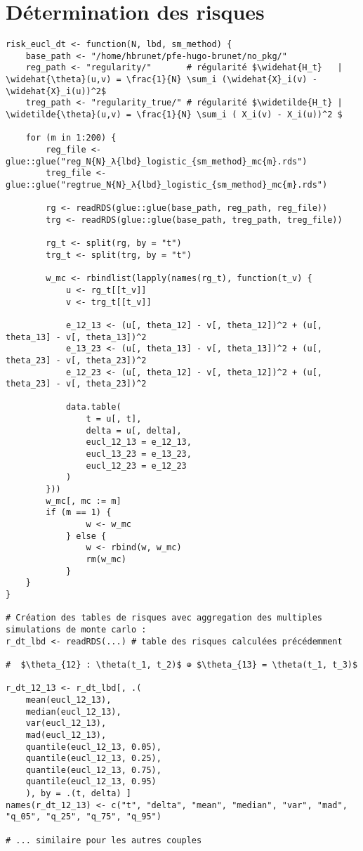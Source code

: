 \section{Détermination des risques}

\begin{verbatim}
risk_eucl_dt <- function(N, lbd, sm_method) {
    base_path <- "/home/hbrunet/pfe-hugo-brunet/no_pkg/"
    reg_path <- "regularity/"       # régularité $\widehat{H_t}   | \widehat{\theta}(u,v) = \frac{1}{N} \sum_i (\widehat{X}_i(v) - \widehat{X}_i(u))^2$
    treg_path <- "regularity_true/" # régularité $\widetilde{H_t} | \widetilde{\theta}(u,v) = \frac{1}{N} \sum_i ( X_i(v) - X_i(u))^2 $

    for (m in 1:200) {
        reg_file <- glue::glue("reg_N{N}_λ{lbd}_logistic_{sm_method}_mc{m}.rds")
        treg_file <- glue::glue("regtrue_N{N}_λ{lbd}_logistic_{sm_method}_mc{m}.rds")

        rg <- readRDS(glue::glue(base_path, reg_path, reg_file))
        trg <- readRDS(glue::glue(base_path, treg_path, treg_file))

        rg_t <- split(rg, by = "t")
        trg_t <- split(trg, by = "t")

        w_mc <- rbindlist(lapply(names(rg_t), function(t_v) {
            u <- rg_t[[t_v]]
            v <- trg_t[[t_v]]

            e_12_13 <- (u[, theta_12] - v[, theta_12])^2 + (u[, theta_13] - v[, theta_13])^2
            e_13_23 <- (u[, theta_13] - v[, theta_13])^2 + (u[, theta_23] - v[, theta_23])^2
            e_12_23 <- (u[, theta_12] - v[, theta_12])^2 + (u[, theta_23] - v[, theta_23])^2

            data.table(
                t = u[, t],
                delta = u[, delta],
                eucl_12_13 = e_12_13,
                eucl_13_23 = e_13_23,
                eucl_12_23 = e_12_23
            )
        }))
        w_mc[, mc := m]
        if (m == 1) {
                w <- w_mc
            } else {
                w <- rbind(w, w_mc)
                rm(w_mc)
            }
    }
}

# Création des tables de risques avec aggregation des multiples simulations de monte carlo :
r_dt_lbd <- readRDS(...) # table des risques calculées précédemment

#  $\theta_{12} : \theta(t_1, t_2)$ ⊕ $\theta_{13} = \theta(t_1, t_3)$

r_dt_12_13 <- r_dt_lbd[, .(
    mean(eucl_12_13), 
    median(eucl_12_13), 
    var(eucl_12_13), 
    mad(eucl_12_13), 
    quantile(eucl_12_13, 0.05), 
    quantile(eucl_12_13, 0.25), 
    quantile(eucl_12_13, 0.75), 
    quantile(eucl_12_13, 0.95)
    ), by = .(t, delta) ]
names(r_dt_12_13) <- c("t", "delta", "mean", "median", "var", "mad", "q_05", "q_25", "q_75", "q_95")

# ... similaire pour les autres couples
\end{verbatim}

